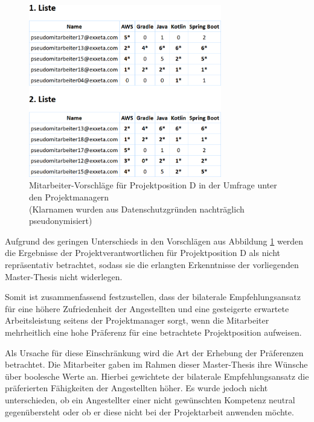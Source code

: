 \begin{figure}[h]
	\centering
	\includegraphics[width=0.75\textwidth]{gfx/projektposition-d.png}
	\caption[Mitarbeiter-Vorschläge für Projektposition D in der Umfrage unter den Projektmanagern]{Mitarbeiter-Vorschläge für Projektposition D in der Umfrage unter den Projektmanagern\\
	(Klarnamen wurden aus Datenschutzgründen nachträglich pseudonymisiert)}
	\label{fig:diskussion:interpretation:abb2}
\end{figure}

Aufgrund des geringen Unterschieds in den Vorschlägen aus Abbildung \ref{fig:diskussion:interpretation:abb2} werden die Ergebnisse der Projektverantwortlichen für Projektposition D als nicht repräsentativ betrachtet, sodass sie die erlangten Erkenntnisse der vorliegenden Master-Thesis nicht widerlegen.

Somit ist zusammenfassend festzustellen, dass der bilaterale Empfehlungsansatz für eine höhere Zufriedenheit der Angestellten und eine gesteigerte erwartete Arbeitsleistung seitens der Projektmanager sorgt, wenn die Mitarbeiter mehrheitlich eine hohe Präferenz für eine betrachtete Projektposition aufweisen.

Als Ursache für diese Einschränkung wird die Art der Erhebung der Präferenzen betrachtet. Die Mitarbeiter gaben im Rahmen dieser Master-Thesis ihre Wünsche über boolesche Werte an. Hierbei gewichtete der bilaterale Empfehlungsansatz die präferierten Fähigkeiten der Angestellten höher. Es wurde jedoch nicht unterschieden, ob ein Angestellter einer nicht gewünschten Kompetenz neutral gegenübersteht oder ob er diese nicht bei der Projektarbeit anwenden möchte.

